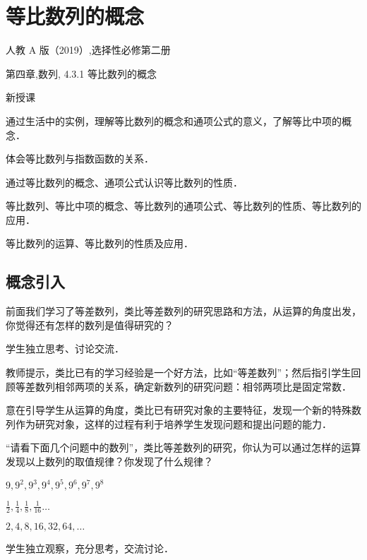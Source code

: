 \chapter{等比数列的概念}
\TM 人教 A 版（2019）,选择性必修第二册\par
\TC 第四章,数列, 4.3.1 等比数列的概念\par
\LT 新授课\par
\TP \par
\begin{enumerateout}
    \item 通过生活中的实例，理解等比数列的概念和通项公式的意义，了解等比中项的概念．
    \item 体会等比数列与指数函数的关系．
    \item 通过等比数列的概念、通项公式认识等比数列的性质．
\end{enumerateout}
\TE 等比数列、等比中项的概念、等比数列的通项公式、等比数列的性质、等比数列的应用．\par
\TD 等比数列的运算、等比数列的性质及应用．\par
\TProcess
\section{概念引入}
\begin{problem}
前面我们学习了等差数列，类比等差数列的研究思路和方法，从运算的角度出发，你觉得还有怎样的数列是值得研究的？
\end{problem}

\TSA 学生独立思考、讨论交流．

教师提示，类比已有的学习经验是一个好方法，比如“等差数列”；然后指引学生回顾等差数列相邻两项的关系，确定新数列的研究问题：相邻两项比是固定常数．

\DP 意在引导学生从运算的角度，类比已有研究对象的主要特征，发现一个新的特殊数列作为研究对象，这样的过程有利于培养学生发现问题和提出问题的能力．
\begin{problem}
“请看下面几个问题中的数列”，类比等差数列的研究，你认为可以通过怎样的运算发现以上数列的取值规律？你发现了什么规律？
\begin{enumerateout}
    \item $9,9^{2}, 9^{3}, 9^{4}, 9^{5}, 9^{6}, 9^{7}, 9^{8}$
    \item $\frac{1}{2}, \frac{1}{4}, \frac{1}{8}, \frac{1}{16} \ldots$
    \item $2,4,8,16,32,64, \ldots$
\end{enumerateout}
\end{problem}
\TSA 学生独立观察，充分思考，交流讨论．

